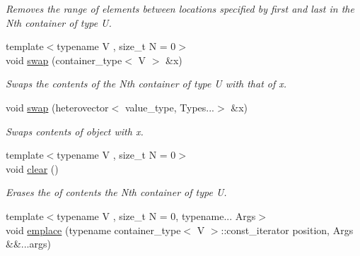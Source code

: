 \begin{DoxyCompactItemize}
\begin{DoxyCompactList}\small\item\em Removes the range of elements between locations specified by first and last in the Nth container of type U. \end{DoxyCompactList}\item 
\hypertarget{classheterogeneous_1_1heterovector_3_01_t_00_01_u_00_01_types_8_8_8_4_a5439f3f29f5429c596d6efc64bd8b838}{}{\footnotesize template$<$typename V , size\+\_\+t N = 0$>$ }\\void \hyperlink{classheterogeneous_1_1heterovector_3_01_t_00_01_u_00_01_types_8_8_8_4_a5439f3f29f5429c596d6efc64bd8b838}{swap} (container\+\_\+type$<$ V $>$ \&x)\label{classheterogeneous_1_1heterovector_3_01_t_00_01_u_00_01_types_8_8_8_4_a5439f3f29f5429c596d6efc64bd8b838}

\begin{DoxyCompactList}\small\item\em Swaps the contents of the Nth container of type U with that of x. \end{DoxyCompactList}\item 
\hypertarget{classheterogeneous_1_1heterovector_3_01_t_00_01_u_00_01_types_8_8_8_4_adc450b57acd3aafe0915ca649d6d5e6d}{}void \hyperlink{classheterogeneous_1_1heterovector_3_01_t_00_01_u_00_01_types_8_8_8_4_adc450b57acd3aafe0915ca649d6d5e6d}{swap} (heterovector$<$ value\+\_\+type, Types...$>$ \&x)\label{classheterogeneous_1_1heterovector_3_01_t_00_01_u_00_01_types_8_8_8_4_adc450b57acd3aafe0915ca649d6d5e6d}

\begin{DoxyCompactList}\small\item\em Swaps contents of object with x. \end{DoxyCompactList}\item 
\hypertarget{classheterogeneous_1_1heterovector_3_01_t_00_01_u_00_01_types_8_8_8_4_af31bb3d121cc3e611465c7f8c64a819f}{}{\footnotesize template$<$typename V , size\+\_\+t N = 0$>$ }\\void \hyperlink{classheterogeneous_1_1heterovector_3_01_t_00_01_u_00_01_types_8_8_8_4_af31bb3d121cc3e611465c7f8c64a819f}{clear} ()\label{classheterogeneous_1_1heterovector_3_01_t_00_01_u_00_01_types_8_8_8_4_af31bb3d121cc3e611465c7f8c64a819f}

\begin{DoxyCompactList}\small\item\em Erases the of contents the Nth container of type U. \end{DoxyCompactList}\item 
\hypertarget{classheterogeneous_1_1heterovector_3_01_t_00_01_u_00_01_types_8_8_8_4_ac0ac5a034cec1e424a1c9983f055a475}{}{\footnotesize template$<$typename V , size\+\_\+t N = 0, typename... Args$>$ }\\void \hyperlink{classheterogeneous_1_1heterovector_3_01_t_00_01_u_00_01_types_8_8_8_4_ac0ac5a034cec1e424a1c9983f055a475}{emplace} (typename container\+\_\+type$<$ V $>$\+::const\+\_\+iterator position, Args \&\&...args)\label{classheterogeneous_1_1heterovector_3_01_t_00_01_u_00_01_types_8_8_8_4_ac0ac5a034cec1e424a1c9983f055a475}


\end{DoxyCompactItemize}
